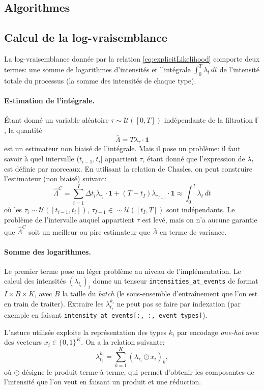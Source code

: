 \documentclass[11pt]{article}
\begin{document}
\begin{appendices}
\section{Algorithmes}\label{sec:algoAppendix}

\subsection{Calcul de la log-vraisemblance}

La log-vraisemblance donnée par la relation \eqref{eq:explicitLikelihood} comporte deux termes: une somme de logarithmes d'intensités et l'intégrale $\int_0^T\lambda_t\,dt$ de l'intensité totale du processus (la somme des intensités de chaque type).

\paragraph{Estimation de l'intégrale.} Étant donné un variable aléatoire $\tau\sim\mathcal{U}([0,T])$ indépendante de la filtration $\mathds{F}$, la quantité 
\[
\bar{\Lambda} = T\lambda_\tau\cdot\mathbf 1
\]
est un estimateur non biaisé de l'intégrale. Mais il pose un problème: il faut savoir à quel intervalle $(t_{i-1}, t_i]$ appartient $\tau$, étant donné que l'expression de $\lambda_t$ est définie par morceaux. En utilisant la relation de Chasles, on peut construire l'estimateur (non biaisé) suivant:
\begin{equation}
\hat{\Lambda}^C = \sum_{i=1}^{I} \Delta t_i\lambda_{\tau_i} \cdot \mathbf{1} + (T-t_{I})\lambda_{\tau_{I+1}}\cdot\mathbf{1}
\approx
\int_0^T \lambda_t\,dt
\end{equation}
où les $\tau_i\sim\mathcal{U}([t_{i-1}, t_i])$, $\tau_{I+1}\in\sim\mathcal{U}([t_I, T])$ sont indépendants. Le problème de l'intervalle auquel appartient $\tau$ est levé, mais on n'a aucune garantie que $\hat{\Lambda}^C$ soit un meilleur ou pire estimateur que $\bar{\Lambda}$ en terme de variance.

\paragraph{Somme des logarithmes.} Le premier terme pose un léger problème au niveau de l'implémentation. Le calcul des intensités ${(\lambda_{t_i})}_i$ donne un tenseur \verb|intensities_at_events| de format $I\times B\times K$, avec $B$ la taille du \textit{batch} (le sous-ensemble d'entraînement que l'on est en train de traiter). Extraire les $\lambda^{k_i}_{t_i}$ ne peut pas se faire par indexation (par exemple en faisant \verb|intensity_at_events[:, :, event_types]|).

L'astuce utilisée exploite la représentation des types $k_i$ par encodage \textit{one-hot} avec des vecteurs $x_i\in{\{0,1\}}^K$. On a la relation suivante:
\[
	\lambda^{k_i}_{t_i} = \sum_{k=1}^K {(\lambda_{\tau_i} \odot x_i)}_k,
\]
où $\odot$ désigne le produit terme-à-terme, qui permet d'obtenir les composantes de l'intensité que l'on veut en faisant un produit et une réduction.

\end{appendices}
\end{document}

